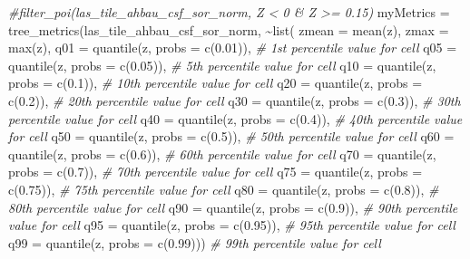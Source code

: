 \documentclass[
]{article}
\newenvironment{Shaded}{\begin{snugshade}}{\end{snugshade}}
\newcommand{\AttributeTok}[1]{\textcolor[rgb]{0.77,0.63,0.00}{#1}}
\newcommand{\CommentTok}[1]{\textcolor[rgb]{0.56,0.35,0.01}{\textit{#1}}}
\newcommand{\FloatTok}[1]{\textcolor[rgb]{0.00,0.00,0.81}{#1}}
\newcommand{\FunctionTok}[1]{\textcolor[rgb]{0.00,0.00,0.00}{#1}}
\newcommand{\NormalTok}[1]{#1}
\newcommand{\OtherTok}[1]{\textcolor[rgb]{0.56,0.35,0.01}{#1}}
\newcommand{\SpecialCharTok}[1]{\textcolor[rgb]{0.00,0.00,0.00}{#1}}
\begin{document}
\begin{Shaded}
\begin{Highlighting}[]
\CommentTok{\#filter\_poi(las\_tile\_ahbau\_csf\_sor\_norm, Z \textless{} 0 \& Z \textgreater{}= 0.15)}
\NormalTok{myMetrics }\OtherTok{=} \FunctionTok{tree\_metrics}\NormalTok{(las\_tile\_ahbau\_csf\_sor\_norm, }\SpecialCharTok{\textasciitilde{}}\FunctionTok{list}\NormalTok{(}
    \AttributeTok{zmean   =} \FunctionTok{mean}\NormalTok{(z),}
    \AttributeTok{zmax    =} \FunctionTok{max}\NormalTok{(z),}
    \AttributeTok{q01     =} \FunctionTok{quantile}\NormalTok{(z, }\AttributeTok{probs =} \FunctionTok{c}\NormalTok{(}\FloatTok{0.01}\NormalTok{)),     }\CommentTok{\# 1st percentile value for cell}
    \AttributeTok{q05     =} \FunctionTok{quantile}\NormalTok{(z, }\AttributeTok{probs =} \FunctionTok{c}\NormalTok{(}\FloatTok{0.05}\NormalTok{)),     }\CommentTok{\# 5th percentile value for cell}
    \AttributeTok{q10     =} \FunctionTok{quantile}\NormalTok{(z, }\AttributeTok{probs =} \FunctionTok{c}\NormalTok{(}\FloatTok{0.1}\NormalTok{)),      }\CommentTok{\# 10th percentile value for cell}
    \AttributeTok{q20     =} \FunctionTok{quantile}\NormalTok{(z, }\AttributeTok{probs =} \FunctionTok{c}\NormalTok{(}\FloatTok{0.2}\NormalTok{)),      }\CommentTok{\# 20th percentile value for cell}
    \AttributeTok{q30     =} \FunctionTok{quantile}\NormalTok{(z, }\AttributeTok{probs =} \FunctionTok{c}\NormalTok{(}\FloatTok{0.3}\NormalTok{)),      }\CommentTok{\# 30th percentile value for cell}
    \AttributeTok{q40     =} \FunctionTok{quantile}\NormalTok{(z, }\AttributeTok{probs =} \FunctionTok{c}\NormalTok{(}\FloatTok{0.4}\NormalTok{)),      }\CommentTok{\# 40th percentile value for cell}
    \AttributeTok{q50     =} \FunctionTok{quantile}\NormalTok{(z, }\AttributeTok{probs =} \FunctionTok{c}\NormalTok{(}\FloatTok{0.5}\NormalTok{)),      }\CommentTok{\# 50th percentile value for cell}
    \AttributeTok{q60     =} \FunctionTok{quantile}\NormalTok{(z, }\AttributeTok{probs =} \FunctionTok{c}\NormalTok{(}\FloatTok{0.6}\NormalTok{)),      }\CommentTok{\# 60th percentile value for cell}
    \AttributeTok{q70     =} \FunctionTok{quantile}\NormalTok{(z, }\AttributeTok{probs =} \FunctionTok{c}\NormalTok{(}\FloatTok{0.7}\NormalTok{)),      }\CommentTok{\# 70th percentile value for cell}
    \AttributeTok{q75     =} \FunctionTok{quantile}\NormalTok{(z, }\AttributeTok{probs =} \FunctionTok{c}\NormalTok{(}\FloatTok{0.75}\NormalTok{)),     }\CommentTok{\# 75th percentile value for cell}
    \AttributeTok{q80     =} \FunctionTok{quantile}\NormalTok{(z, }\AttributeTok{probs =} \FunctionTok{c}\NormalTok{(}\FloatTok{0.8}\NormalTok{)),      }\CommentTok{\# 80th percentile value for cell}
    \AttributeTok{q90     =} \FunctionTok{quantile}\NormalTok{(z, }\AttributeTok{probs =} \FunctionTok{c}\NormalTok{(}\FloatTok{0.9}\NormalTok{)),      }\CommentTok{\# 90th percentile value for cell}
    \AttributeTok{q95     =} \FunctionTok{quantile}\NormalTok{(z, }\AttributeTok{probs =} \FunctionTok{c}\NormalTok{(}\FloatTok{0.95}\NormalTok{)),     }\CommentTok{\# 95th percentile value for cell}
    \AttributeTok{q99     =} \FunctionTok{quantile}\NormalTok{(z, }\AttributeTok{probs =} \FunctionTok{c}\NormalTok{(}\FloatTok{0.99}\NormalTok{)))     }\CommentTok{\# 99th percentile value for cell}
  



\end{Highlighting}
\end{Shaded}
\end{document}
